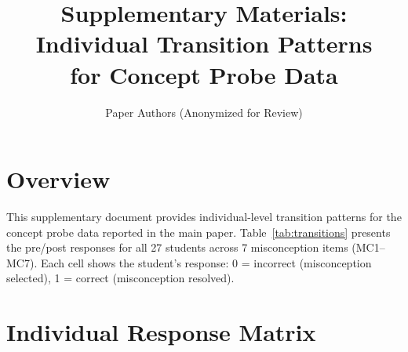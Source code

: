 \documentclass[11pt]{article}
\title{Supplementary Materials: Individual Transition Patterns \\
       for Concept Probe Data}
\author{Paper Authors (Anonymized for Review)}
\date{}
\begin{document}
\maketitle

\section*{Overview}

This supplementary document provides individual-level transition patterns for the concept probe data reported in the main paper. Table~\ref{tab:transitions} presents the pre/post responses for all 27 students across 7 misconception items (MC1--MC7). Each cell shows the student's response: 0 = incorrect (misconception selected), 1 = correct (misconception resolved).

\section*{Individual Response Matrix}
\end{document}
